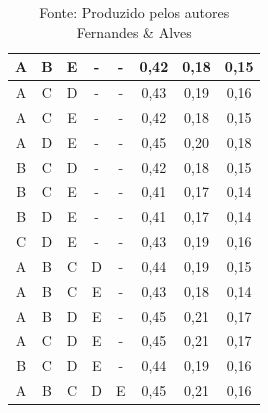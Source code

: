 \begin{spacing}{1}
\begin{table}[htb]
\begin{tabular}{|c|c|c|c|c|c|c|c|}
        A & B & E & - & - & \cellcolor[HTML]{83CB96}0,42 & \cellcolor[HTML]{87CD9A}0,18 & \cellcolor[HTML]{89CE9C}0,15 \\ \hline
        A & C & D & - & - & \cellcolor[HTML]{79C78E}0,43 & \cellcolor[HTML]{7CC991}0,19 & \cellcolor[HTML]{7DC992}0,16 \\ \hline
        A & C & E & - & - & \cellcolor[HTML]{85CC99}0,42 & \cellcolor[HTML]{8ACE9D}0,18 & \cellcolor[HTML]{8DCF9F}0,15 \\ \hline
        A & D & E & - & - & \cellcolor[HTML]{65BF7D}0,45 & \cellcolor[HTML]{66BF7D}0,20 & \cellcolor[HTML]{63BE7B}0,18 \\ \hline
        B & C & D & - & - & \cellcolor[HTML]{85CC98}0,42 & \cellcolor[HTML]{8ACE9D}0,18 & \cellcolor[HTML]{8CCF9F}0,15 \\ \hline
        B & C & E & - & - & \cellcolor[HTML]{93D2A5}0,41 & \cellcolor[HTML]{99D4AA}0,17 & \cellcolor[HTML]{9DD6AD}0,14 \\ \hline
        B & D & E & - & - & \cellcolor[HTML]{8FD0A1}0,41 & \cellcolor[HTML]{95D2A6}0,17 & \cellcolor[HTML]{98D4A9}0,14 \\ \hline
        C & D & E & - & - & \cellcolor[HTML]{7AC78F}0,43 & \cellcolor[HTML]{7DC992}0,19 & \cellcolor[HTML]{7EC992}0,16 \\ \hline
        A & B & C & D & - & \cellcolor[HTML]{77C68C}0,44 & \cellcolor[HTML]{7AC88F}0,19 & \cellcolor[HTML]{89CE9C}0,15 \\ \hline
        A & B & C & E & - & \cellcolor[HTML]{81CB95}0,43 & \cellcolor[HTML]{86CC99}0,18 & \cellcolor[HTML]{96D3A7}0,14 \\ \hline
        A & B & D & E & - & \cellcolor[HTML]{64BF7C}0,45 & \cellcolor[HTML]{64BF7C}0,21 & \cellcolor[HTML]{70C486}0,17 \\ \hline
        A & C & D & E & - & \cellcolor[HTML]{65BF7D}0,45 & \cellcolor[HTML]{65BF7D}0,21 & \cellcolor[HTML]{71C487}0,17 \\ \hline
        B & C & D & E & - & \cellcolor[HTML]{71C488}0,44 & \cellcolor[HTML]{74C58A}0,19 & \cellcolor[HTML]{82CB96}0,16 \\ \hline
        A & B & C & D & E & \cellcolor[HTML]{63BE7B}0,45 & \cellcolor[HTML]{63BE7B}0,21 & \cellcolor[HTML]{7EC993}0,16 \\ \hline
    \end{tabular}
    \caption*{Fonte: Produzido pelos autores Fernandes \& Alves}
\end{table}
\end{spacing}

